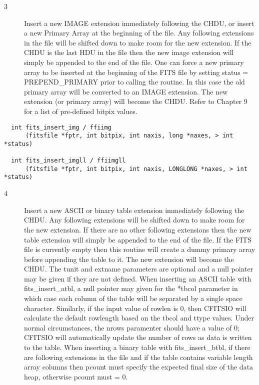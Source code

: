 \documentclass[11pt]{book}
\begin{document}
\begin{description}
\item[3 ] Insert a new IMAGE extension immediately following the CHDU, or
    insert a new Primary Array at the beginning of the file.  Any
    following extensions in the file will be shifted down to make room
    for the new extension.  If the CHDU is the last HDU in the file
    then the new image extension will simply be appended to the end of
    the file.   One can force a new primary array to be inserted at the
    beginning of the FITS file by setting status = PREPEND\_PRIMARY prior
    to calling the routine.  In this case the old primary array will be
    converted to an IMAGE extension. The new extension (or primary
    array) will become the CHDU.  Refer to Chapter 9 for a list of
   pre-defined bitpix values.  \label{ffiimg}
\end{description}

\begin{verbatim}
  int fits_insert_img / ffiimg
      (fitsfile *fptr, int bitpix, int naxis, long *naxes, > int *status)

  int fits_insert_imgll / ffiimgll
      (fitsfile *fptr, int bitpix, int naxis, LONGLONG *naxes, > int *status)
\end{verbatim}

\begin{description}
\item[4 ] Insert a new ASCII or binary table extension immediately following the CHDU.
    Any following extensions will be shifted down to make room for the
    new extension.  If there are no other following extensions then the
    new table extension will simply be appended to the end of the
    file.   If the FITS file is currently empty then this routine will
    create a dummy primary array before appending the table to it. The
    new extension will become the CHDU.  The tunit and extname
    parameters are optional and a null pointer may be given if they are
    not defined.  When inserting an ASCII table with
    fits\_insert\_atbl, a null pointer  may given for the *tbcol
    parameter in which case each column of the table will be separated
    by a single space character. Similarly, if the input value of
    rowlen is  0, then CFITSIO will calculate the default rowlength
    based on the tbcol and ttype values.  Under normal circumstances,
    the nrows
    paramenter should have a value of 0; CFITSIO will automatically update
    the number of rows as data is written to the table.  When inserting a binary table
    with fits\_insert\_btbl, if there are following extensions in the
    file and if the table contains variable length array columns then
    pcount must specify the expected final size of the data heap,
   otherwise pcount must = 0. \label{ffitab} \label{ffibin}
\end{description}
\end{document}
